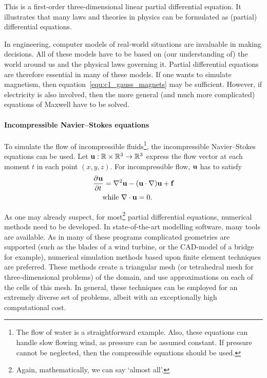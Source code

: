 This is a first-order three-dimensional linear partial differential equation. It illustrates that many laws and theories in physics can be formulated as (partial) differential equations.

In engineering, computer models of real-world situations are invaluable in making decisions. All of these models have to be based on (our understanding of) the world around us and the physical laws governing it. Partial differential equations are therefore essential in many of these models. If one wants to simulate magnetism, then equation~\eqref{equ:c1_gauss_magnets} may be sufficient. However, if electricity is also involved, then the more general (and much more complicated) equations of Maxwell have to be solved.


\paragraph{Incompressible Navier--Stokes equations} To simulate the flow of incompressible fluids\footnote{The flow of water is a straightforward example. Also, these equations can handle slow flowing wind, as pressure can be assumed constant. If pressure cannot be neglected, then the compressible equations should be used.}, the incompressible Navier--Stokes equations can be used. Let $\vb{u} : \mathbb{R} \times \mathbb{R}^3 \to \mathbb{R}^3$ express the flow vector at each moment $t$ in each point $(x, y, z)$. For incompressible flow, $\vb{u}$ has to satisfy
\begin{align*}
    & \pdv[]{\vb{u}}{t} = \nabla^2\vb{u} - (\vb{u}\cdot \nabla)\vb{u} + \vb{f} \\
    &\quad\text{ while }\nabla\cdot \vb{u} = 0\text{.}
\end{align*}

As one may already suspect, for most\footnote{Again, mathematically, we can say `almost all'.} partial differential equations, numerical methods need to be developed. In state-of-the-art modelling software, many tools are available. As in many of these programs complicated geometries are supported (such as the blades of a wind turbine, or the CAD-model of a bridge for example), numerical simulation methods based upon finite element techniques are preferred. These methods create a triangular mesh (or tetrahedral mesh for three-dimensional problems) of the domain, and use approximations on each of the cells of this mesh. In general, these techniques can be employed for an extremely diverse set of problems, albeit with an exceptionally high computational cost.

